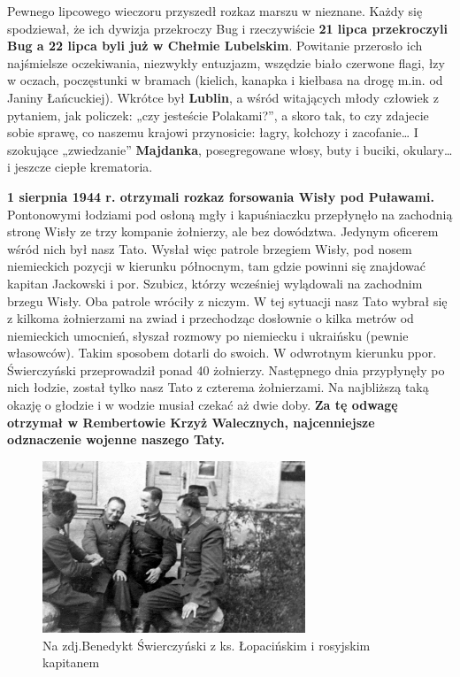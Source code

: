 Pewnego lipcowego wieczoru przyszedł rozkaz  marszu w nieznane. Każdy się spodziewał, że ich dywizja przekroczy Bug i rzeczywiście \textbf{21 lipca przekroczyli Bug a 22 lipca byli już w Chełmie Lubelskim}. Powitanie przerosło ich najśmielsze oczekiwania, niezwykły entuzjazm, wszędzie biało czerwone flagi, łzy w oczach, poczęstunki w bramach (kielich, kanapka i kiełbasa na drogę m.in. od Janiny Łańcuckiej). Wkrótce był \textbf{Lublin}, a wśród witających  młody człowiek z pytaniem, jak policzek: „czy jesteście Polakami?”, a skoro tak, to czy zdajecie sobie sprawę, co naszemu krajowi przynosicie: łagry, kołchozy i zacofanie… I szokujące „zwiedzanie” \textbf{Majdanka}, posegregowane włosy, buty i buciki, okulary… i jeszcze ciepłe krematoria.

\textbf{1 sierpnia 1944 r. otrzymali rozkaz forsowania Wisły pod Puławami.}
Pontonowymi łodziami pod osłoną mgły i kapuśniaczku przepłynęło na zachodnią stronę Wisły ze trzy kompanie żołnierzy, ale bez dowództwa. Jedynym oficerem wśród nich był nasz Tato. Wysłał więc patrole brzegiem Wisły, pod nosem niemieckich pozycji w kierunku północnym, tam gdzie powinni się znajdować kapitan Jackowski i por. Szubicz, którzy wcześniej wylądowali na zachodnim brzegu Wisły. Oba patrole wróciły z niczym. W tej sytuacji nasz Tato wybrał się z kilkoma żołnierzami na zwiad i przechodząc dosłownie o kilka metrów od niemieckich umocnień, słyszał rozmowy po niemiecku i ukraińsku (pewnie własowców). Takim sposobem dotarli do swoich. W odwrotnym kierunku ppor. Świerczyński przeprowadził ponad 40 żołnierzy. Następnego dnia przypłynęły po nich łodzie, został tylko nasz Tato z czterema żołnierzami. Na najbliższą taką okazję o głodzie i w wodzie musiał czekać aż dwie doby. \textbf{Za tę odwagę otrzymał w Rembertowie Krzyż Walecznych, najcenniejsze odznaczenie wojenne naszego Taty.}

\begin{figure}[!h]
\begin{center}
\includegraphics[width=0.7\textwidth]{photo/benedykt_swierczynski_wojna_2.jpg}
\caption[Benedykt Świerczyński z ks. Łopacińskim i rosyjskim kapitanem]{Na zdj.Benedykt Świerczyński z ks. Łopacińskim i rosyjskim kapitanem}
\end{center}
\end{figure}

